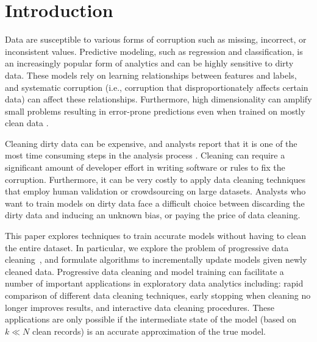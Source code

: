\section{Introduction}
Data are susceptible to various forms of corruption such as missing, incorrect, or inconsistent values.
Predictive modeling, such as regression and classification, is an increasingly popular form of analytics \cite{bdas, alexandrov2014stratosphere, crotty2014tupleware, hellerstein2012madlib} and can be highly sensitive to dirty data.
These models rely on learning relationships between features and labels, and systematic corruption \cite{taylor1982introduction} (i.e., corruption that disproportionately affects certain data) can affect these relationships.
Furthermore, high dimensionality can amplify small problems resulting in error-prone predictions even when trained on mostly clean data \cite{xiaofeature}.

Cleaning dirty data can be expensive, and analysts report that it is one of the most time consuming steps in the analysis process \cite{nytimes}.
Cleaning can require a significant amount of developer effort in writing software or rules to fix the corruption.
Furthermore, it can be very costly to apply data cleaning techniques that employ human validation or crowdsourcing on large datasets.
Analysts who want to train models on dirty data face a difficult choice between discarding the dirty data and inducing an unknown bias, or paying the price of data cleaning.

This paper explores techniques to train accurate models without having to clean the entire dataset.
In particular, we explore the problem of progressive data cleaning~\cite{altowim2014progressive, whang2014incremental, papenbrock2015progressive, gruenheid2014incremental, mayfield2010eracer, DBLP:journals/pvldb/YakoutENOI11, yakout2013don}, and formulate algorithms to incrementally update models given newly cleaned data.
Progressive data cleaning and model training can facilitate a number of important applications in exploratory data analytics including: rapid comparison of different data cleaning techniques, early stopping when cleaning no longer improves results, and interactive data cleaning procedures.
These applications are only possible if the intermediate state of the model (based on $k \ll N$ clean records) is an accurate approximation of the true model.

